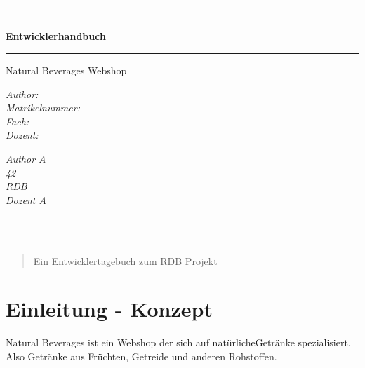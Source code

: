 \documentclass[a4paper, 11pt]{article}
\begin{document}
\newpage


\begin{verbatim}




\end{verbatim}
\begin{center}


\newcommand{\HRule}{\rule{\linewidth}{0.5mm}}
\HRule \\[0.4cm]
{ \huge \bfseries Entwicklerhandbuch}
\HRule

\Large{Natural Beverages Webshop} \\[1cm]

\begin{minipage}{0.55\textwidth}
\begin{flushleft} \large
\emph{Author:} \\
\emph{Matrikelnummer:} \\
\emph{Fach:} \\
\emph{Dozent:}
\end{flushleft}
\end{minipage}
\hfill
\begin{minipage}{0.4\textwidth}
\begin{flushright} \large
\emph{Author \textsc{A}} \\
\emph{42} \\
\emph{RDB} \\
\emph{Dozent \textsc{A}}
\end{flushright}
\end{minipage}
\end{center}
\begin{verbatim}



\end{verbatim}

\begin{abstract}
\noindent %
Ein Entwicklertagebuch zum RDB Projekt \\ [1cm]
\end{abstract}

\newpage

\tableofcontents
\listoffigures

\newpage
\section{Einleitung - Konzept}
Natural Beverages ist ein Webshop der sich auf \grqq natürliche\grqq  Getränke spezialisiert. Also Getränke aus Früchten, Getreide und anderen Rohstoffen. \\ 
\end{document}

